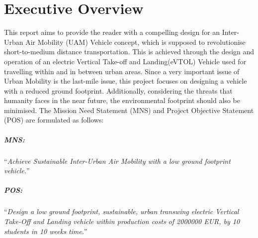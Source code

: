 \chapter*{Executive Overview}
This report aims to provide the reader with a compelling design for an Inter-Urban Air Mobility (UAM) Vehicle concept, which is supposed to revolutionise short-to-medium distance transportation.
This is achieved through the design and operation of an electric Vertical Take-off and Landing(eVTOL) Vehicle used for travelling within and in between urban areas.
Since a very important issue of Urban Mobility is the last-mile issue, this project focuses on designing a vehicle with a reduced ground footprint.
Additionally, considering the threats that humanity faces in the near future, the environmental footprint should also be minimised. The Mission Need Statement (MNS) and Project Objective Statement (POS) are formulated as follows:

\paragraph{MNS:}“\textit{Achieve Sustainable Inter-Urban Air Mobility with a low ground footprint vehicle.}”
\vspace{-5mm}
\paragraph{POS:}“\textit{Design a low ground footprint, sustainable, urban transwing electric Vertical Take-Off and Landing vehicle within production costs of 2000000 EUR, by 10 students in 10 weeks time.}”


